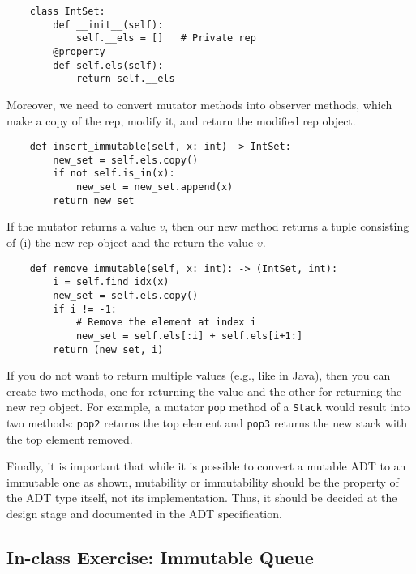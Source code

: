 \documentclass[oneside,11pt,dvipsnames]{book}
\newcommand{\code}[1]{\texttt{#1}}
\begin{document}
\begin{lstlisting}
    class IntSet:
        def __init__(self):
            self.__els = []   # Private rep
        @property
        def self.els(self):
            return self.__els
\end{lstlisting}

Moreover, we need to convert mutator methods into observer methods, which make a copy of the rep, modify it, and return the modified rep object.  
\begin{lstlisting}
    def insert_immutable(self, x: int) -> IntSet:
        new_set = self.els.copy()
        if not self.is_in(x):
            new_set = new_set.append(x)
        return new_set
\end{lstlisting}

If the mutator returns a value $v$, then our new method returns a tuple consisting of (i) the new rep object and the return the value $v$. 
\begin{lstlisting}
    def remove_immutable(self, x: int): -> (IntSet, int):
        i = self.find_idx(x)
        new_set = self.els.copy()
        if i != -1:
            # Remove the element at index i
            new_set = self.els[:i] + self.els[i+1:]  
        return (new_set, i)
\end{lstlisting}

If you do not want to return multiple values (e.g., like in Java), then you can create two methods, one for returning the value and the other for returning the new rep object.
For example, a mutator \code{pop} method of a \code{Stack} would result into two methods: \code{pop2} returns the top element and \code{pop3} returns the new stack with the top element removed.

Finally, it is important that while it is possible to convert a mutable ADT to an immutable one as shown, mutability or immutability should be the property of the ADT type itself, not its implementation. Thus, it should be decided at the design stage and documented in the ADT specification.

\subsection{In-class Exercise: Immutable Queue}\label{ic:immutable-queue}
\end{document}

